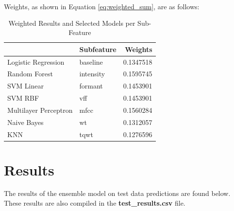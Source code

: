 \documentclass[
]{article}
\begin{document}
Weights, as shown in Equation \ref{eq:weighted_sum}, are as follows:

\begin{table}

\caption{\label{tab:unnamed-chunk-9}Weighted Results and Selected Models per Sub-Feature}
\centering
\begin{tabular}[t]{llr}
\toprule
  & Subfeature & Weights\\
\midrule
Logistic Regression & baseline & 0.1347518\\
Random Forest & intensity & 0.1595745\\
SVM Linear & formant & 0.1453901\\
SVM RBF & vff & 0.1453901\\
Multilayer Perceptron & mfcc & 0.1560284\\
\addlinespace
Naive Bayes & wt & 0.1312057\\
KNN & tqwt & 0.1276596\\
\bottomrule
\end{tabular}
\end{table}

\newpage

\hypertarget{results}{%
\section{Results}\label{results}}

The results of the ensemble model on test data predictions are found below. These results are also compiled in the \textbf{test\_results.csv} file.\\
\end{document}
